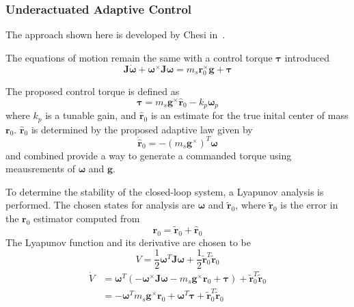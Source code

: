 \subsubsection{Underactuated Adaptive Control}\label{sec:under_adaptive}
The approach shown here is developed by Chesi in~\cite{chesi_automatic_2014}.

The equations of motion remain the same with a control torque $\bm{\tau}$ introduced
\begin{equation} \label{equation:EomWithTau}
    \bm{J}\dot{\bm{\omega}} + \bm{\omega}^\times \bm{J\omega} 
    = m_s\bm{r}_0^{\times}\bm{g} + \bm{\tau}
\end{equation}

The proposed control torque is defined as
\begin{equation}\label{equation:proposed_adaptive}
    \bm{\tau} = m_s\bm{g}^\times\bm{\hat{r}}_0 - k_p\bm{\omega}_p
\end{equation}
where $k_p$ is a tunable gain,  and $\hat{\bm{r}}_0$ is an estimate for the true inital center of mass ${\bm{r}}_0$.  $\hat{\bm{r}}_0$ is determined by the proposed adaptive law given by
\begin{equation} \label{equation:adaptive_law}
    \dot{\hat{\bm{r}}}_0 = -(m_s\bm{g}^{\times})^T\bm{\omega}
\end{equation}
 and  combined provide a way to generate a commanded torque using meausrements of $\bm{\omega}$ and $\bm{g}$. 

To determine the stability of the closed-loop system, a Lyapunov analysis is performed. The chosen states for analysis are $\bm{\omega}$ and $\tilde{\bm{r}}_0$, where $\tilde{\bm{r}}_0$ is the error in the $\bm{r}_0$ estimator computed from
\begin{equation}\label{equation:r_relations}
    \bm{r}_0= \tilde{\bm{r}}_0+\hat{\bm{r}}_0
\end{equation} 
The Lyapunov function and its derivative are chosen to be 
\begin{equation}
    {V} = \frac{1}{2}\bm{\omega}^T\bm{J\omega} + \frac{1}{2}\tilde{\bm{r}}_0^T\tilde{\bm{r}}_0
\end{equation}
\begin{align}
    \dot{V} &= \bm{\omega}^T(-\bm{\omega}^\times \bm{J\omega} 
    -m_s\bm{g}^{\times}\bm{r}_0 + \bm{\tau}) 
    + \tilde{\bm{r}}_0^T\dot{\tilde{\bm{r}}}_0 \\
    &= -\bm{\omega}^Tm_s\bm{g}^{\times}\bm{r}_0+\bm{\omega}^T\bm{\tau}
    + \tilde{\bm{r}}_0^T\dot{\tilde{\bm{r}}}_0
\end{align}

